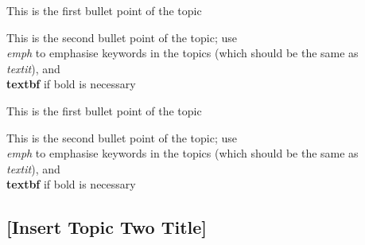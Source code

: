 \documentclass[../workbook]{subfiles}
\begin{document}



\begin{bullets}
    \item This is the first bullet point of the topic
    \item This is the second bullet point of the topic; use \emph{\\emph} to emphasise keywords in the topics (which should be the same as \emph{\\textit}), and \textbf{\\textbf} if bold is necessary
\end{bullets}


\begin{numbers}
    \item This is the first bullet point of the topic
    \item This is the second bullet point of the topic; use \emph{\\emph} to emphasise keywords in the topics (which should be the same as \emph{\\textit}), and \textbf{\\textbf} if bold is necessary
\end{numbers}


\subsection{[Insert Topic Two Title]}

\end{document}
